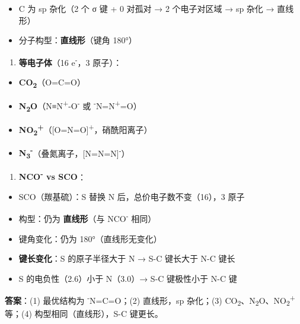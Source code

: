 \documentclass[a4paper,11pt]{ctexart}
\providecommand{\tightlist}{\setlength{\itemsep}{0pt}\setlength{\parskip}{0pt}}
\begin{document}
\begin{itemize}
\tightlist
\item
  C 为 sp 杂化（2 个 σ 键 + 0 对孤对 → 2 个电子对区域 → sp 杂化 → 直线形）
\item
  分子构型：\textbf{直线形}（键角 180°）
\end{itemize}

\begin{enumerate}
\def\labelenumi{(\arabic{enumi})}
\setcounter{enumi}{2}
\tightlist
\item
  \textbf{等电子体}（16 e\textsuperscript{-}，3 原子）：
\end{enumerate}

\begin{itemize}
\tightlist
\item
  \textbf{CO\textsubscript{2}}（O=C=O）
\item
  \textbf{N\textsubscript{2}O}（N≡N\textsuperscript{+}-O\textsuperscript{-} 或 \textsuperscript{-}N=N\textsuperscript{+}=O）
\item
  \textbf{NO\textsubscript{2}\textsuperscript{+}}（{[}O=N=O{]}\textsuperscript{+}，硝酰阳离子）
\item
  \textbf{N\textsubscript{3}\textsuperscript{-}}（叠氮离子，{[}N=N=N{]}\textsuperscript{-}）
\end{itemize}

\begin{enumerate}
\def\labelenumi{(\arabic{enumi})}
\setcounter{enumi}{3}
\tightlist
\item
  \textbf{NCO\textsuperscript{-} vs SCO}：
\end{enumerate}

\begin{itemize}
\tightlist
\item
  SCO（羰基硫）：S 替换 N 后，总价电子数不变（16），3 原子
\item
  构型：仍为 \textbf{直线形}（与 NCO\textsuperscript{-} 相同）
\item
  键角变化：仍为 180°（直线形无变化）
\item
  \textbf{键长变化}：S 的原子半径大于 N → S-C 键长大于 N-C 键长
\item
  S 的电负性（2.6）小于 N（3.0）→ S-C 键极性小于 N-C 键
\end{itemize}

\textbf{答案}：(1) 最优结构为 \textsuperscript{-}N=C=O；(2) 直线形，sp 杂化；(3) CO\textsubscript{2}、N\textsubscript{2}O、NO\textsubscript{2}\textsuperscript{+} 等；(4) 构型相同（直线形），S-C 键更长。
\end{document}
